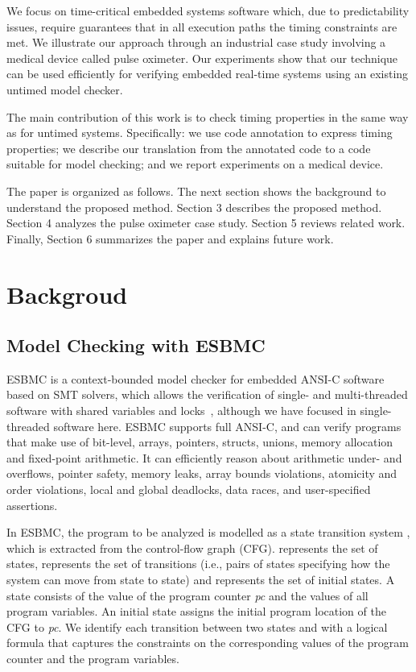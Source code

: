 \documentclass{llncs}
\begin{document}
We focus on time-critical embedded systems software which, due to predictability issues, 
require guarantees that in all execution paths
the timing constraints are met.
We illustrate our approach through an industrial case study
involving a medical device called pulse oximeter.  Our experiments show
that our technique can be used efficiently for verifying embedded real-time systems
using an existing untimed model checker.


The main contribution of this work is to check timing properties in the same way as for untimed systems. Specifically: 
we use code annotation to express timing properties; 
we describe our 
translation from the annotated code to a code suitable for model checking; and 
we report experiments
on a medical device.

The paper is organized as follows. 
The next section shows the background to understand the proposed method.
Section 3 describes the proposed method.
Section 4 analyzes the pulse oximeter case study.
Section 5 reviews related work.
Finally, Section 6 summarizes the paper and explains future work.



\section {Backgroud}

\subsection{Model Checking with ESBMC}

ESBMC is a context-bounded model checker for embedded ANSI-C software based on SMT solvers, which allows the verification of single- and multi-threaded 
software with shared variables and locks~\cite{Cordeiro09,cordeiro11}, although we have focused in single-threaded software here.
ESBMC supports full ANSI-C, and can verify programs that make use of bit-level, arrays, pointers, structs, unions, 
memory allocation and fixed-point arithmetic. It can efficiently reason about arithmetic under- and overflows, pointer safety, 
memory leaks, array bounds violations, atomicity and order violations, local and global deadlocks, data races, 
and user-specified assertions.

In ESBMC, the program to be analyzed is modelled as a state transition system , which is extracted from the control-flow graph (CFG). 
 represents the set of states,  represents the set of transitions 
(i.e., pairs of states specifying how the system can move from state to state) 
and  represents the set of initial states. 
A state  consists of the value  of the program counter \emph{pc} and the values of all program variables. 
An initial state  assigns the initial program location of the CFG to \emph{pc}. 
We identify each transition  between two states  and  
with a logical formula  that captures the constraints on the corresponding values 
of the program counter and the program variables.
\end{document}
